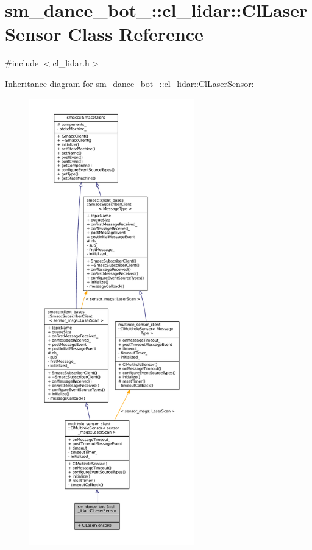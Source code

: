 \hypertarget{classsm__dance__bot__3_1_1cl__lidar_1_1ClLaserSensor}{}\section{sm\+\_\+dance\+\_\+bot\+\_\+:\+:cl\+\_\+lidar\+:\+:Cl\+Laser\+Sensor Class Reference}
\label{classsm__dance__bot__3_1_1cl__lidar_1_1ClLaserSensor}


{\ttfamily \#include $<$cl\+\_\+lidar.\+h$>$}



Inheritance diagram for sm\+\_\+dance\+\_\+bot\+\_\+:\+:cl\+\_\+lidar\+:\+:Cl\+Laser\+Sensor\+:
\nopagebreak
\begin{figure}[H]
\begin{center}
\leavevmode
\includegraphics[height=550pt]{classsm__dance__bot__3_1_1cl__lidar_1_1ClLaserSensor__inherit__graph}
\end{center}
\end{figure}


